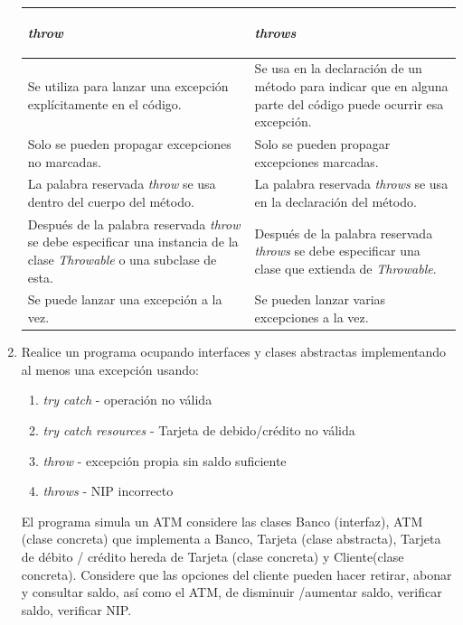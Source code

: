 \documentclass[12pt]{article}
\begin{document}
\begin{enumerate}
    \begin{table}[h!]
      \centering
      \begin{tabular}{|p{}|p{}|}
        \hline
        \begin{center} \textbf{\textit{throw}} \end{center} & \begin{center} \textbf{\textit{throws}} \end{center} \\ \hline 
        Se utiliza para lanzar una excepción explícitamente en el código. & Se usa en la declaración de un método para indicar que en alguna parte del código puede ocurrir esa excepción. \\ \hline
        Solo se pueden propagar excepciones no marcadas. & Solo se pueden propagar excepciones marcadas. \\ \hline
        La palabra reservada \textit{throw} se usa dentro del cuerpo del método. & La palabra reservada \textit{throws} se usa en la declaración del método. \\ \hline
        Después de la palabra reservada \textit{throw} se debe especificar una instancia de la clase \textit{Throwable} o una subclase de esta. & Después de la palabra reservada \textit{throws} se debe especificar una clase que extienda de \textit{Throwable}. \\ \hline
        Se puede lanzar una excepción a la vez. & Se pueden lanzar varias excepciones a la vez. \\ \hline
      \end{tabular}
    \end{table}

    \item Realice un programa ocupando interfaces y clases abstractas implementando al menos una excepción usando:
    \begin{enumerate}[label=\alph*.]
      \item \textit{try catch} - operación no válida
      \item \textit{try catch resources} - Tarjeta de debido/crédito no válida
      \item \textit{throw} - excepción propia sin saldo suficiente
      \item \textit{throws} - NIP incorrecto
    \end{enumerate}
    El programa simula un ATM considere las clases Banco (interfaz), ATM (clase concreta) que implementa a Banco, Tarjeta (clase abstracta), Tarjeta de débito / crédito hereda de Tarjeta (clase concreta) y Cliente(clase concreta). Considere que las opciones del cliente pueden hacer retirar, abonar y consultar saldo, así como el ATM, de disminuir /aumentar saldo, verificar saldo, verificar NIP.


\end{enumerate}
\end{document}
